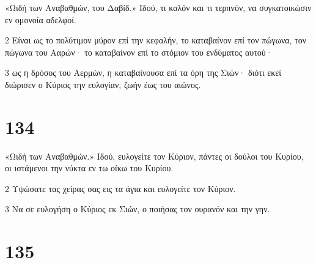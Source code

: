 \par «Ωιδή των Αναβαθμών, του Δαβίδ.» Ιδού, τι καλόν και τι τερπνόν, να συγκατοικώσιν εν ομονοία αδελφοί.
\par 2 Είναι ως το πολύτιμον μύρον επί την κεφαλήν, το καταβαίνον επί τον πώγωνα, τον πώγωνα του Ααρών· το καταβαίνον επί το στόμιον του ενδύματος αυτού·
\par 3 ως η δρόσος του Αερμών, η καταβαίνουσα επί τα όρη της Σιών· διότι εκεί διώρισεν ο Κύριος την ευλογίαν, ζωήν έως του αιώνος.

\chapter{134}

\par «Ωιδή των Αναβαθμών.» Ιδού, ευλογείτε τον Κύριον, πάντες οι δούλοι του Κυρίου, οι ιστάμενοι την νύκτα εν τω οίκω του Κυρίου.
\par 2 Υψώσατε τας χείρας σας εις τα άγια και ευλογείτε τον Κύριον.
\par 3 Να σε ευλογήση ο Κύριος εκ Σιών, ο ποιήσας τον ουρανόν και την γην.

\chapter{135}

